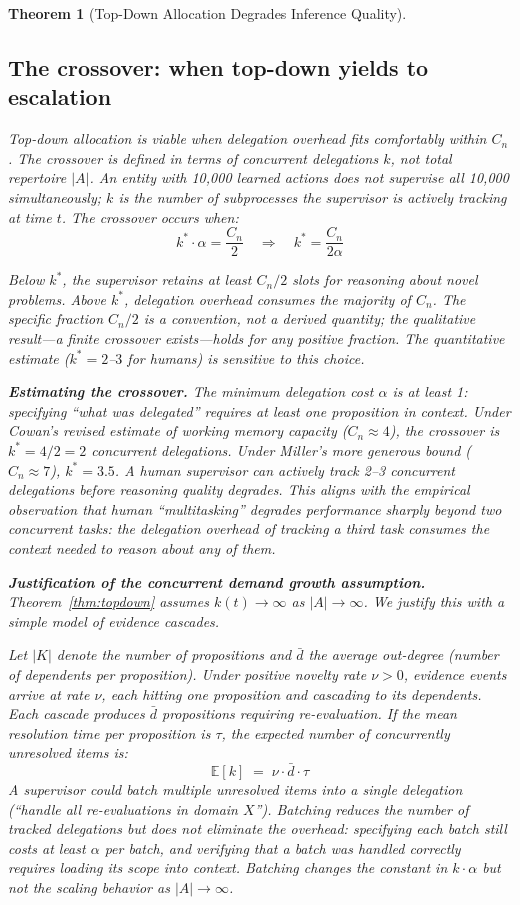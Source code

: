\documentclass[11pt]{article}
\newtheorem{theorem}{Theorem}
\theoremstyle{definition}
\begin{document}
\begin{theorem}[Top-Down Allocation Degrades Inference Quality]
\subsection{The crossover: when top-down yields to escalation}
\label{sec:crossover}

Top-down allocation is viable when delegation overhead fits comfortably
within $C_n$. The crossover is defined in terms of \emph{concurrent
delegations} $k$, not total repertoire $|A|$. An entity with
10{,}000 learned actions does not supervise all 10{,}000
simultaneously; $k$ is the number of subprocesses the supervisor is
actively tracking at time $t$. The crossover occurs when:
\[
k^* \cdot \alpha = \frac{C_n}{2}
\quad\Longrightarrow\quad
k^* = \frac{C_n}{2\alpha}
\]

Below $k^*$, the supervisor retains at least $C_n/2$ slots for
reasoning about novel problems. Above $k^*$, delegation overhead
consumes the majority of $C_n$. The specific fraction $C_n/2$ is a
convention, not a derived quantity; the qualitative result---a finite
crossover exists---holds for any positive fraction. The quantitative
estimate ($k^* = 2$--$3$ for humans) is sensitive to this choice.

\textbf{Estimating the crossover.} The minimum delegation cost $\alpha$
is at least 1: specifying ``what was delegated'' requires at least one
proposition in context. Under Cowan's \cite{Cowan2001} revised estimate
of working memory capacity ($C_n \approx 4$), the crossover is
$k^* = 4/2 = 2$ concurrent delegations. Under Miller's more generous
bound ($C_n \approx 7$), $k^* = 3.5$. A human supervisor can
actively track 2--3 concurrent delegations before reasoning quality
degrades. This aligns with the empirical observation that human
``multitasking'' degrades performance sharply beyond two concurrent
tasks: the delegation overhead of tracking a third task consumes the
context needed to reason about any of them.

\textbf{Justification of the concurrent demand growth assumption.}
Theorem~\ref{thm:topdown} assumes $k(t) \to \infty$ as
$|A| \to \infty$. We justify this with a simple model of evidence
cascades.

Let $|K|$ denote the number of propositions and $\bar{d}$ the average
out-degree (number of dependents per proposition). Under positive
novelty rate $\nu > 0$, evidence events arrive at rate $\nu$, each
hitting one proposition and cascading to its dependents. Each cascade
produces $\bar{d}$ propositions requiring re-evaluation. If the mean
resolution time per proposition is $\tau$, the expected number of
concurrently unresolved items is:
\[
\mathbb{E}[k] \;=\; \nu \cdot \bar{d} \cdot \tau
\]
A supervisor could batch multiple unresolved items into a single
delegation (``handle all re-evaluations in domain $X$''). Batching
reduces the number of tracked delegations but does not eliminate the
overhead: specifying each batch still costs at least $\alpha$ per
batch, and verifying that a batch was handled correctly requires
loading its scope into context. Batching changes the constant in
$k \cdot \alpha$ but not the scaling behavior as $|A| \to \infty$.


\end{theorem}
\end{document}
